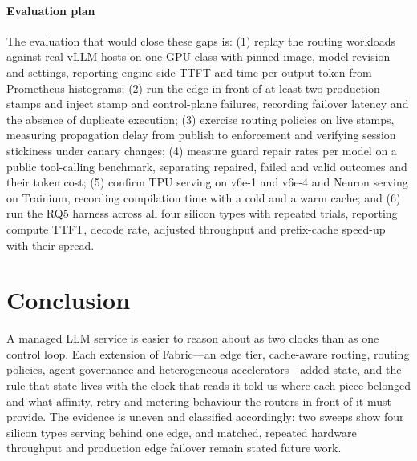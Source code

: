 \documentclass[conference,letterpaper]{IEEEtran}
\newcommand{\sys}{Fabric}
\begin{document}
\paragraph*{Evaluation plan}
The evaluation that would close these gaps is: (1) replay the routing workloads against real
vLLM hosts on one GPU class with pinned image, model revision and settings, reporting engine-side
TTFT and time per output token from Prometheus histograms; (2) run the edge in front of at least
two production stamps and inject stamp and control-plane failures, recording failover latency and
the absence of duplicate execution; (3) exercise routing policies on live stamps, measuring
propagation delay from publish to enforcement and verifying session stickiness under canary
changes; (4) measure guard repair rates per model on a public tool-calling benchmark, separating
repaired, failed and valid outcomes and their token cost; (5) confirm TPU serving on v6e-1
and v6e-4 and Neuron serving on Trainium, recording compilation time with a cold and a warm
cache; and (6) run the RQ5 harness across all four silicon types with repeated trials, reporting
compute TTFT, decode rate, adjusted throughput and prefix-cache speed-up with their spread.

\section{Conclusion}
\label{sec:conclusion}
A managed LLM service is easier to reason about as two clocks than as one control loop. Each
extension of \sys{}---an edge tier, cache-aware routing, routing policies, agent governance and
heterogeneous accelerators---added state, and the rule that state lives with the clock that
reads it told us where each piece belonged and what affinity, retry and metering behaviour the
routers in front of it must provide. The evidence is uneven and classified accordingly: two
sweeps show four silicon types serving behind one edge, and matched, repeated hardware throughput
and production edge failover remain stated future work.

\appendices
\end{document}
